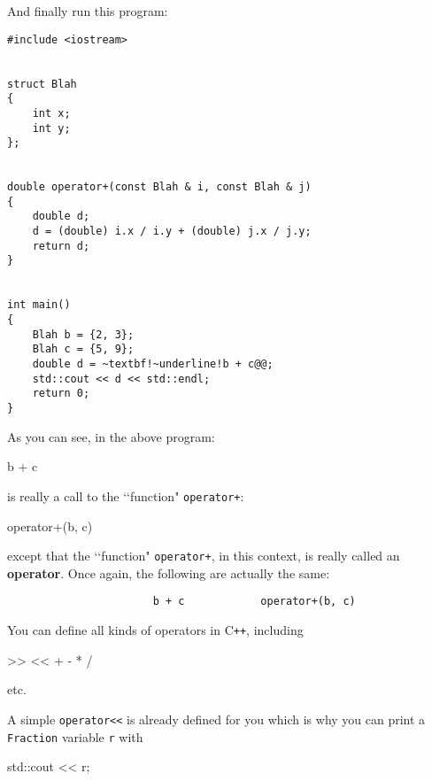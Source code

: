 And finally run this program:
\begin{Verbatim}[frame=single, commandchars=~!@]
#include <iostream>


struct Blah
{
    int x;
    int y;
};


double operator+(const Blah & i, const Blah & j)
{
    double d;
    d = (double) i.x / i.y + (double) j.x / j.y;
    return d;
}

  
int main()
{
    Blah b = {2, 3};
    Blah c = {5, 9};
    double d = ~textbf!~underline!b + c@@;
    std::cout << d << std::endl;
    return 0;
}
\end{Verbatim}

As you can see, in the above program:
\begin{console}
b + c
\end{console}
is really a call to the \lq\lq function" \verb!operator+!:
\begin{console}
 operator+(b, c)
\end{console}
except that the \lq\lq function" \verb!operator+!, in this context, is really
called an \textbf{\large operator}. Once again, the following are actually the
same:
\begin{Verbatim}
                       b + c            operator+(b, c)
\end{Verbatim}

You can define all kinds of operators in C\texttt{++}, including
\begin{console}
 >>      <<      +      -      *      /
\end{console}
etc.

A simple \verb!operator<<! is already defined for you which is why you can
print a \verb!Fraction! variable \verb!r! with
\begin{console}
std::cout << r;
\end{console}
